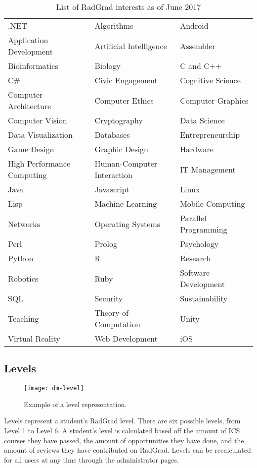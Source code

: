 \begin{table}[h!]
\centering
\begin{tabular}{ l l l } 
.NET & Algorithms & Android \\ 
Application Development & Artificial Intelligence & Assembler \\
Bioinformatics & Biology & C and C++ \\
C\# & Civic Engagement & Cognitive Science \\
Computer Architecture & Computer Ethics & Computer Graphics \\
Computer Vision & Cryptography & Data Science \\
Data Visualization & Databases & Entrepreneurship \\
Game Design & Graphic Design & Hardware \\
High Performance Computing & Human-Computer Interaction & IT Management \\
Java & Javascript & Linux \\
Lisp & Machine Learning & Mobile Computing \\
Networks & Operating Systems & Parallel Programming \\
Perl & Prolog & Psychology \\
Python & R & Research \\
Robotics & Ruby & Software Development \\
SQL & Security & Sustainability \\
Teaching & Theory of Computation & Unity \\
Virtual Reality & Web Development & iOS
\end{tabular}
\caption{List of RadGrad interests as of June 2017}
\label{table:2}
\end{table}

\subsection{Levels}
\begin{figure}[h]
\centering
\texttt{[image: dm-level]}
\caption{Example of a level representation.}
\end{figure}
Levels represent a student's RadGrad level. There are six possible levels, from Level 1 to Level 6. A student's level is calculated based off the amount of ICS courses they have passed, the amount of opportunities they have done, and the amount of reviews they have contributed on RadGrad. Levels can be recalculated for all users at any time through the administrator pages.

